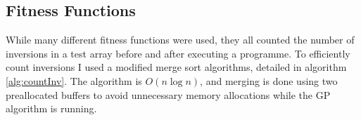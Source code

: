 \documentclass{article}
\begin{document}
        \begin{algorithm}
        	
        	
        	
        \end{algorithm}
	
	\subsection{Fitness Functions}
	
        While many different fitness functions were used, they all counted the number of inversions in a test array before and after executing a programme. To efficiently count inversions I used a modified merge sort algorithms, detailed in algorithm \ref{alg:countInv}. The algorithm is $O(n\log{}n)$, and merging is done using two preallocated buffers to avoid unnecessary memory allocations while the GP algorithm is running.
        
\end{document}
